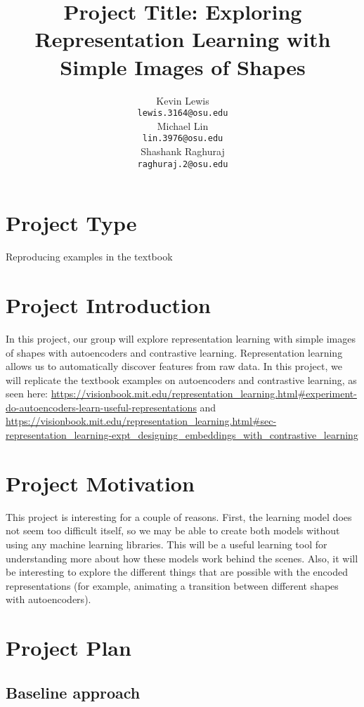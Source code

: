 \documentclass{article}
\title{Project Title: Exploring Representation Learning with Simple Images of Shapes}
\author{%
  Kevin Lewis\\
  \texttt{lewis.3164@osu.edu} \\
  \And
  Michael Lin\\
  \texttt{lin.3976@osu.edu} \\
    \And
  Shashank Raghuraj\\
  \texttt{raghuraj.2@osu.edu} \\
}
\begin{document}
\maketitle



\section{Project Type}
Reproducing examples in the textbook

\section{Project Introduction}
{\color{black}
In this project, our group will explore representation learning with simple images of shapes with autoencoders and contrastive learning. Representation learning allows us to automatically discover features from raw data.
In this project, we will replicate the textbook examples on autoencoders and contrastive learning, as seen here: 
\url{https://visionbook.mit.edu/representation_learning.html#experiment-do-autoencoders-learn-useful-representations}
and 
\url{https://visionbook.mit.edu/representation_learning.html#sec-representation_learning-expt_designing_embeddings_with_contrastive_learning}
} 


\section{Project Motivation}

This project is interesting for a couple of reasons. First, the learning model does not seem too difficult itself, so we may be able to create both models without using any machine learning libraries.  This will be a useful learning tool for understanding more about how these models work behind the scenes.  Also, it will be interesting to explore the different things that are possible with the encoded representations (for example, animating a transition between different shapes with autoencoders).

\section{Project Plan}
\subsection{Baseline approach}
\end{document}
